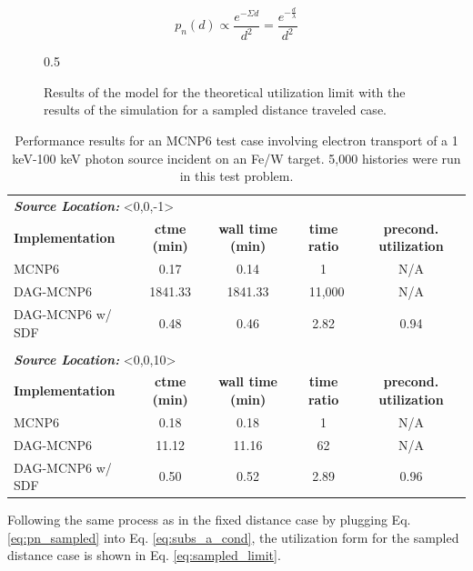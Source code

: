 \begin{equation}
  \label{eq:pn_sampled}
p_n(d) \propto \frac{e^{-\Sigma d}}{d^{2}} = \frac{e^{-\frac{d}{\lambda}}}{d^{2}}
\end{equation}

\begin{figure}[ht]
\centering
{0.5\textwidth}
\caption{Results of the model for the theoretical utilization limit with the
results of the simulation for a sampled distance traveled case.}
\label{fig:sdf_sampled_dist}
\end{figure}

\begin{table}[!h]
  \centering
  \begin{tabular}{lcccc}
          \multicolumn{5}{l}{\textbf{\textit{Source Location:}} <0,0,-1>} \\
          \textbf{Implementation} & \textbf{ctme (min)} & \textbf{wall time
            (min)} & \textbf{time ratio} & \textbf{precond. utilization}\\
          \hline
          MCNP6 & 0.17 & 0.14 & 1 & N/A \\
          DAG-MCNP6 & 1841.33 & 1841.33 & ~11,000 & N/A \\
          DAG-MCNP6 w/ SDF & 0.48 & 0.46 & 2.82 & 0.94\\
          \multicolumn{5}{l}{} \\
          \multicolumn{5}{l}{\textbf{\textit{Source Location:}} <0,0,10>} \\
          \textbf{Implementation} & \textbf{ctme (min)} & \textbf{wall time
            (min)} & \textbf{time ratio} & \textbf{precond. utilization}\\
          \hline
          MCNP6 & 0.18 & 0.18 & 1 & N/A \\
          DAG-MCNP6 & 11.12 & 11.16 & 62 & N/A \\
          DAG-MCNP6 w/ SDF & 0.50 & 0.52 & 2.89 & 0.96 \\
          
  \end{tabular}
  \caption{Performance results for an MCNP6 test case involving electron
    transport of a 1 keV-100 keV photon source incident on an Fe/W target. 5,000
    histories were run in this test problem.}
  \label{tab:inp066_results}
\end{table}

Following the same process as in the fixed distance case by plugging Eq. \ref{eq:pn_sampled} into
Eq. \ref{eq:subs_a_cond}, the utilization form for the sampled distance case is
shown in Eq. \ref{eq:sampled_limit}.

